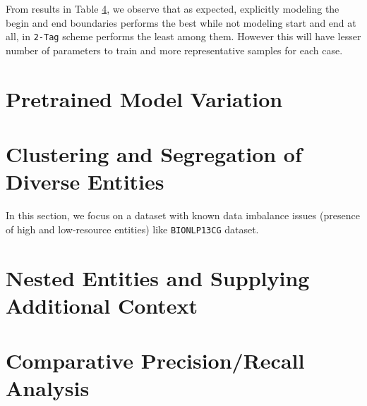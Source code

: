 From results in Table \ref{}, we observe that as expected, explicitly modeling the begin and end boundaries performs the best while not modeling start and end at all, in \texttt{2-Tag} scheme performs the least among them. However this will have lesser number of parameters to train and more representative samples for each case.

\section{Pretrained Model Variation}


\section{Clustering and Segregation of Diverse Entities}
In this section, we focus on a dataset with known data imbalance issues (presence of high and low-resource entities) like \texttt{BIONLP13CG} dataset.

\section{Nested Entities and Supplying Additional Context}

\section{Comparative Precision/Recall Analysis}
